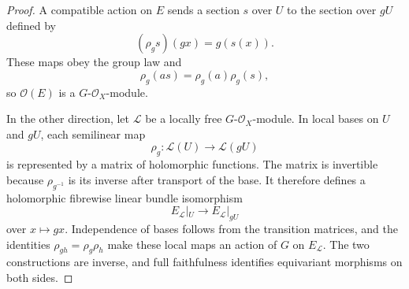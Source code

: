 \begin{proof}
A compatible action on $E$ sends a
section $s$ over $U$ to the section over $gU$ defined by
$$
(\rho_gs)(gx)=g(s(x)).
$$
These maps obey the group law and
$$
\rho_g(as)=\rho_g(a)\rho_g(s),
$$
so $\mathcal O(E)$ is a $G$-$\mathcal O_X$-module.

In the other direction, let $\mathcal L$ be a locally free
$G$-$\mathcal O_X$-module. In local bases on $U$ and $gU$, each semilinear
map
$$
\rho_g:\mathcal L(U)\longrightarrow\mathcal L(gU)
$$
is represented by a matrix of holomorphic functions. The matrix is
invertible because $\rho_{g^{-1}}$ is its inverse after transport of the
base. It therefore defines a holomorphic fibrewise linear bundle
isomorphism
$$
E_{\mathcal L}|_U\longrightarrow E_{\mathcal L}|_{gU}
$$
over $x\mapsto gx$. Independence of bases follows from the transition
matrices, and the identities $\rho_{gh}=\rho_g\rho_h$ make these local maps
an action of $G$ on $E_{\mathcal L}$. The two constructions are inverse,
and full faithfulness identifies equivariant morphisms on both sides.
\end{proof}
